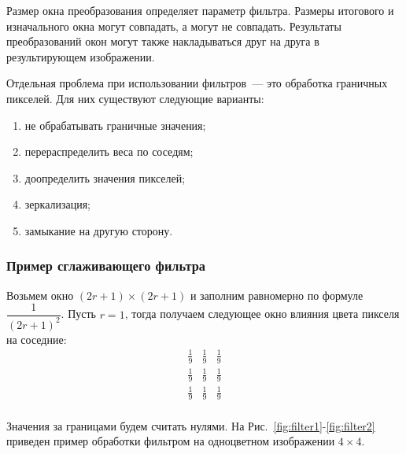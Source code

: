 Размер окна преобразования определяет параметр фильтра. Размеры итогового и изначального окна могут совпадать, а могут не совпадать. Результаты преобразований окон могут также накладываться друг на друга в результирующем изображении.

Отдельная проблема при использовании фильтров~--- это обработка граничных пикселей. Для них существуют следующие варианты:
\begin{enumerate}
    \item не обрабатывать граничные значения;
    \item перераспределить веса по соседям;
    \item доопределить значения пикселей;
    \item зеркализация;
    \item замыкание на другую сторону.
\end{enumerate}

\subsubsection{Пример сглаживающего фильтра}

Возьмем окно $(2r+1)\times(2r+1)$ и заполним равномерно по формуле $\dfrac 1 {(2r+1)^2}$. Пусть $r = 1$, тогда получаем следующее окно влияния цвета пикселя на соседние:
$$
    \begin{matrix}
        \frac 1 9 & \frac 1 9 & \frac 1 9 \\
        \frac 1 9 & \frac 1 9 & \frac 1 9 \\
        \frac 1 9 & \frac 1 9 & \frac 1 9 \\
    \end{matrix}
$$

Значения за границами будем считать нулями. На Рис.~\ref{fig:filter1}-\ref{fig:filter2} приведен пример обработки фильтром на одноцветном изображении $4 \times 4$.

